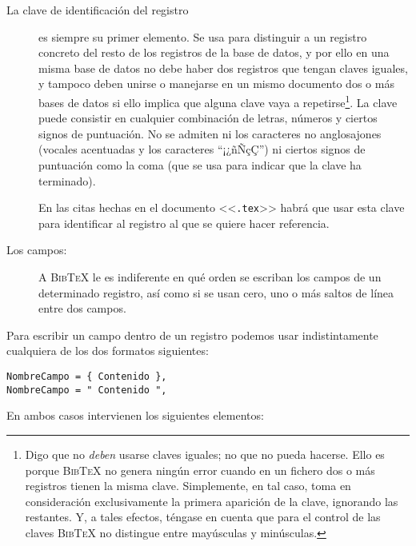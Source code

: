 \documentclass[a4paper,11pt]{article}
\def\btx-{\textsc{Bib\TeX}}
\def\ltr#1-{<<\texttt{#1}>>}
\def\tpf#1-{\ltr.#1-}
\begin{document}
\begin{description}

\item[La clave de identificación del  registro] es siempre su primer elemento.
  Se usa para distinguir a un  registro concreto del resto de los registros de
  la base de  datos, y por ello en  una misma base de datos no  debe haber dos
  registros que tengan  claves iguales, y tampoco deben  unirse o manejarse en
  un mismo documento dos o más bases de datos si ello implica que alguna clave
  vaya a repetirse\footnote{Digo que no \emph{deben} usarse claves iguales; no
    que no pueda  hacerse. Ello es porque \btx- no  genera ningún error cuando
    en un fichero  dos o más registros tienen la  misma clave. Simplemente, en
    tal caso, toma en consideración  exclusivamente la primera aparición de la
    clave, ignorando las restantes. Y,  a tales efectos, téngase en cuenta que
    para  el control  de  las claves  \btx-  no distingue  entre mayúsculas  y
    minúsculas.}.   La  clave  puede  consistir en  cualquier  combinación  de
  letras,  números y  ciertos  signos de  puntuación.   No se  admiten ni  los
  caracteres no anglosajones (vocales  acentuadas y los caracteres ``¡¿ñÑçÇ'')
  ni ciertos signos de puntuación como la coma (que se usa para indicar que la
  clave ha terminado).

  En las citas hechas en el documento \tpf tex- habrá que usar esta clave para
  identificar al registro al que se quiere hacer referencia.

\item[Los campos:]  A \btx-  le es  indiferente en qué  orden se  escriban los
  campos  de un determinado  registro, así  como si  se usan  cero, uno  o más
  saltos de línea entre dos campos.

\end{description}

Para  escribir un  campo dentro  de un  registro podemos  usar indistintamente
cualquiera de los dos formatos siguientes:

{\small
\begin{verbatim}
NombreCampo = { Contenido },
NombreCampo = " Contenido ",
\end{verbatim}
}

En ambos casos intervienen los siguientes elementos:
\end{document}
